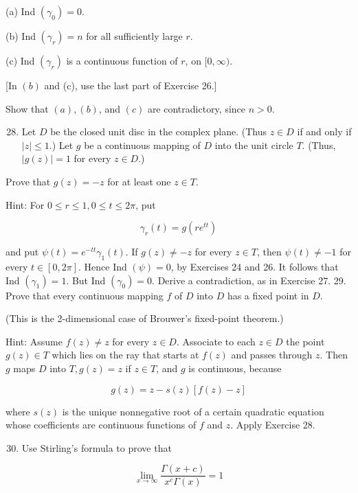 \documentclass[10pt]{article}
\begin{document}
(a) Ind $\left(\gamma_{0}\right)=0$.

(b) Ind $\left(\gamma_{r}\right)=n$ for all sufficiently large $r$.

(c) Ind $\left(\gamma_{r}\right)$ is a continuous function of $r$, on $[0, \infty)$.

[In $(b)$ and (c), use the last part of Exercise 26.]

Show that $(a),(b)$, and $(c)$ are contradictory, since $n>0$.

\begin{enumerate}
  \setcounter{enumi}{27}
  \item Let $D$ be the closed unit disc in the complex plane. (Thus $z \in D$ if and only if $|z| \leq 1$.) Let $g$ be a continuous mapping of $D$ into the unit circle $T$. (Thus, $|g(z)|=1$ for every $z \in D$.)
\end{enumerate}

Prove that $g(z)=-z$ for at least one $z \in T$.

Hint: For $0 \leq r \leq 1,0 \leq t \leq 2 \pi$, put

$$
\gamma_{r}(t)=g\left(r e^{t t}\right)
$$

and put $\psi(t)=e^{-t t} \gamma_{1}(t)$. If $g(z) \neq-z$ for every $z \in T$, then $\psi(t) \neq-1$ for every $t \in[0,2 \pi]$. Hence Ind $(\psi)=0$, by Exercises 24 and 26. It follows that Ind $\left(\gamma_{1}\right)=1$. But Ind $\left(\gamma_{0}\right)=0$. Derive a contradiction, as in Exercise 27. 29. Prove that every continuous mapping $f$ of $D$ into $D$ has a fixed point in $D$.

(This is the 2-dimensional case of Brouwer's fixed-point theorem.)

Hint: Assume $f(z) \neq z$ for every $z \in D$. Associate to each $z \in D$ the point $g(z) \in T$ which lies on the ray that starts at $f(z)$ and passes through $z$. Then $g$ maps $D$ into $T, g(z)=z$ if $z \in T$, and $g$ is continuous, because

$$
g(z)=z-s(z)[f(z)-z]
$$

where $s(z)$ is the unique nonnegative root of a certain quadratic equation whose coefficients are continuous functions of $f$ and $z$. Apply Exercise 28.

\begin{enumerate}
  \setcounter{enumi}{29}
  \item Use Stirling's formula to prove that
\end{enumerate}

$$
\lim _{x \rightarrow \infty} \frac{\Gamma(x+c)}{x^{c} \Gamma(x)}=1
$$
\end{document}
